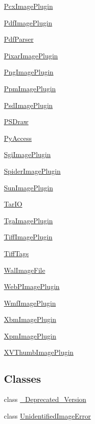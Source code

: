 \begin{DoxyCompactItemize}
\item 
 \hyperlink{namespacePIL_1_1PcxImagePlugin}{Pcx\+Image\+Plugin}
\item 
 \hyperlink{namespacePIL_1_1PdfImagePlugin}{Pdf\+Image\+Plugin}
\item 
 \hyperlink{namespacePIL_1_1PdfParser}{Pdf\+Parser}
\item 
 \hyperlink{namespacePIL_1_1PixarImagePlugin}{Pixar\+Image\+Plugin}
\item 
 \hyperlink{namespacePIL_1_1PngImagePlugin}{Png\+Image\+Plugin}
\item 
 \hyperlink{namespacePIL_1_1PpmImagePlugin}{Ppm\+Image\+Plugin}
\item 
 \hyperlink{namespacePIL_1_1PsdImagePlugin}{Psd\+Image\+Plugin}
\item 
 \hyperlink{namespacePIL_1_1PSDraw}{P\+S\+Draw}
\item 
 \hyperlink{namespacePIL_1_1PyAccess}{Py\+Access}
\item 
 \hyperlink{namespacePIL_1_1SgiImagePlugin}{Sgi\+Image\+Plugin}
\item 
 \hyperlink{namespacePIL_1_1SpiderImagePlugin}{Spider\+Image\+Plugin}
\item 
 \hyperlink{namespacePIL_1_1SunImagePlugin}{Sun\+Image\+Plugin}
\item 
 \hyperlink{namespacePIL_1_1TarIO}{Tar\+IO}
\item 
 \hyperlink{namespacePIL_1_1TgaImagePlugin}{Tga\+Image\+Plugin}
\item 
 \hyperlink{namespacePIL_1_1TiffImagePlugin}{Tiff\+Image\+Plugin}
\item 
 \hyperlink{namespacePIL_1_1TiffTags}{Tiff\+Tags}
\item 
 \hyperlink{namespacePIL_1_1WalImageFile}{Wal\+Image\+File}
\item 
 \hyperlink{namespacePIL_1_1WebPImagePlugin}{Web\+P\+Image\+Plugin}
\item 
 \hyperlink{namespacePIL_1_1WmfImagePlugin}{Wmf\+Image\+Plugin}
\item 
 \hyperlink{namespacePIL_1_1XbmImagePlugin}{Xbm\+Image\+Plugin}
\item 
 \hyperlink{namespacePIL_1_1XpmImagePlugin}{Xpm\+Image\+Plugin}
\item 
 \hyperlink{namespacePIL_1_1XVThumbImagePlugin}{X\+V\+Thumb\+Image\+Plugin}
\end{DoxyCompactItemize}
\subsection*{Classes}
\begin{DoxyCompactItemize}
\item 
class \hyperlink{classPIL_1_1__Deprecated__Version}{\+\_\+\+Deprecated\+\_\+\+Version}
\item 
class \hyperlink{classPIL_1_1UnidentifiedImageError}{Unidentified\+Image\+Error}
\end{DoxyCompactItemize}
